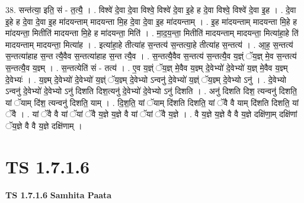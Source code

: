 \documentclass[17pt]{extarticle}
\begin{document}
38. सन्त॑त्या॒ इति॒ सं - त॒त्यै॒ । . विश्वे॑ दे॒वा दे॒वा विश्वे॒ विश्वे॑ दे॒वा इ॒हे ह दे॒वा विश्वे॒ विश्वे॑ दे॒वा इ॒ह । . दे॒वा इ॒हे ह दे॒वा दे॒वा इ॒ह मा॑दयन्ताम् मादयन्ता मि॒ह दे॒वा दे॒वा इ॒ह मा॑दयन्ताम् । . इ॒ह मा॑दयन्ताम् मादयन्ता मि॒हे ह मा॑दयन्ता॒ मितीति॑ मादयन्ता मि॒हे ह मा॑दयन्ता॒ मिति॑ । . मा॒द॒य॒न्ता॒ मितीति॑ मादयन्ताम् मादयन्ता॒ मित्या॑हा॒हे ति॑ मादयन्ताम् मादयन्ता॒ मित्या॑ह । . इत्या॑हा॒हे तीत्या॑ह स॒न्तत्य॑ स॒न्तत्या॒हे तीत्या॑ह स॒न्तत्य॑ । . आ॒ह॒ स॒न्तत्य॑ स॒न्तत्या॑हाह स॒न्त त्यै॒वैव स॒न्तत्या॑हाह स॒न्त त्यै॒व । . स॒न्तत्यै॒वैव स॒न्तत्य॑ स॒न्तत्यै॒व य॒ज्ञ्ं ॅय॒ज्ञ् मे॒व स॒न्तत्य॑ स॒न्तत्यै॒व य॒ज्ञ्म् । . स॒न्तत्येति॑ सं - तत्य॑ । . ए॒व य॒ज्ञ्ं ॅय॒ज्ञ् मे॒वैव य॒ज्ञ्म् दे॒वेभ्यो॑ दे॒वेभ्यो॑ य॒ज्ञ् मे॒वैव य॒ज्ञ्म् दे॒वेभ्यः॑ । . य॒ज्ञ्म् दे॒वेभ्यो॑ दे॒वेभ्यो॑ य॒ज्ञ्ं ॅय॒ज्ञ्म् दे॒वेभ्यो ऽन्वनु॑ दे॒वेभ्यो॑ य॒ज्ञ्ं ॅय॒ज्ञ्म् दे॒वेभ्यो ऽनु॑ । . दे॒वेभ्यो ऽन्वनु॑ दे॒वेभ्यो॑ दे॒वेभ्यो ऽनु॑ दिशति दिश॒त्यनु॑ दे॒वेभ्यो॑ दे॒वेभ्यो ऽनु॑ दिशति । . अनु॑ दिशति दिश॒ त्यन्वनु॑ दिशति॒ यां ॅयाम् दि॑श॒ त्यन्वनु॑ दिशति॒ याम् । . दि॒श॒ति॒ यां ॅयाम् दि॑शति दिशति॒ यां ॅवै वै याम् दि॑शति दिशति॒ यां ॅवै । . यां ॅवै वै यां ॅयां ॅवै य॒ज्ञे य॒ज्ञे वै यां ॅयां ॅवै य॒ज्ञे । . वै य॒ज्ञे य॒ज्ञे वै वै य॒ज्ञे दक्षि॑णा॒म् दक्षि॑णां ॅय॒ज्ञे वै वै य॒ज्ञे दक्षि॑णाम् । \newline
\pagebreak
{}
\section*{ TS 1.7.1.6 }

\textbf{TS 1.7.1.6 } \newline
\textbf{Samhita Paata} \newline
\end{document}
